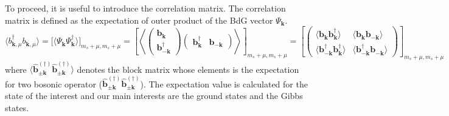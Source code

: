\documentclass[aps, prx, nofootinbib, superscriptaddress]{revtex4-2}
\newcommand{\kvec}{\mathbf{k}}
\begin{document}
To proceed, it is useful to introduce the correlation matrix.
The correlation matrix is defined as the expectation of outer product of the BdG vector $\Psi_{\kvec}$.
\begin{equation}
    \langle b^{\dagger}_{\kvec, \mu} b_{\kvec, \mu}^{\phantom \dagger} \rangle  
    = \Big[ \big\langle \Psi_{\kvec}^{\phantom \dagger} \Psi_{\kvec}^{\dagger} \big\rangle \Big]_{m_{s} + \mu, m_{s} + \mu} 
    = \left[
        \left\langle 
        \begin{pmatrix}
            {\bm b}_{\kvec} \\ {\bm b}^{\dagger}_{- \kvec}
        \end{pmatrix}
        \begin{pmatrix}
            {\bm b}_{\kvec}^{\dagger} & {\bm b}_{- \kvec}
        \end{pmatrix}
        \right\rangle
    \right]_{m_{s} + \mu, m_{s} + \mu} 
    = \left[
        \begin{pmatrix}
            \langle  {\bm b}_{\kvec}^{\phantom \dagger} {\bm b}_{\kvec}^{\dagger}  \rangle
            & \langle  {\bm b}_{\kvec}^{\phantom \dagger} {\bm b}_{- \kvec}^{\phantom \dagger}  \rangle
            \\ 
            \langle  {\bm b}^{\dagger}_{- \kvec} {\bm b}_{\kvec}^{\dagger}  \rangle
            & \langle  {\bm b}^{\dagger}_{- \kvec} {\bm b}_{- \kvec}^{\phantom \dagger}  \rangle
        \end{pmatrix}
    \right]_{m_{s} + \mu, m_{s} + \mu}
\end{equation}
where $\langle \hat{\bm b}_{\pm \kvec}^{(\dagger)} \hat{\bm b}_{\pm \kvec}^{(\dagger)} \rangle $ denotes the block matrix whose elements is the expectation for two bosonic operator ($\hat{\bm b}_{\pm \kvec}^{(\dagger)} \hat{\bm b}_{\pm \kvec}^{(\dagger)}$).
The expectation value is calculated for the state of the interest and our main interests are the ground states and the Gibbs states. 
\end{document}
